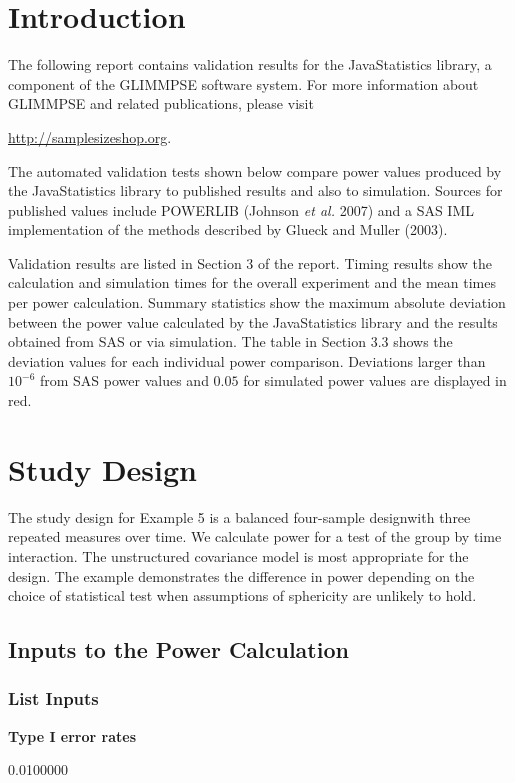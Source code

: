 \documentclass{glimmpse-report}
\begin{document}
\section{Introduction}
The following report contains validation results for the JavaStatistics library, a component of the GLIMMPSE software system.  For more information about GLIMMPSE and related publications, please visit

 

\href{http://samplesizeshop.org}{http://samplesizeshop.org}.

The automated validation tests shown below compare power values produced by the JavaStatistics library to published results and also to simulation.  Sources for published values include POWERLIB (Johnson \emph{et al.} 2007) and a SAS IML implementation of the methods described by Glueck and Muller (2003).

Validation results are listed in Section 3 of the report.  Timing results show the calculation and simulation times for the overall experiment and the mean times per power calculation.  Summary statistics show the maximum absolute deviation between the power value calculated by the JavaStatistics library and the results obtained from SAS or via simulation.  The table in Section 3.3 shows the deviation values for each individual power comparison.  Deviations larger than $10^{-6}$ from SAS power values and $0.05$ for simulated power values are displayed in red.

 \section{Study Design}
The study design for Example 5 is a balanced four-sample designwith three repeated measures over time.  We calculate power for a test of the group by time interaction.  The unstructured covariance model is most appropriate for the design.  The example demonstrates the difference in power depending on the choice of statistical test when assumptions of sphericity are unlikely to hold.
\subsection{Inputs to the Power Calculation}
\subsubsection{List Inputs}

{\bf Type I error rates}

0.0100000
\end{document}
